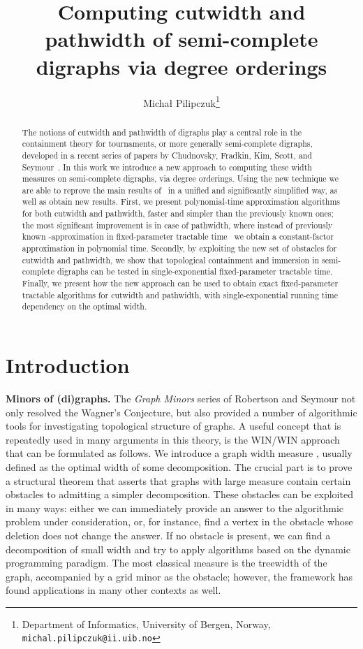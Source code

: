 \documentclass[a4paper,10pt]{article}
\title{Computing cutwidth and pathwidth of semi-complete digraphs via degree orderings}
\date{}
\author{Micha\l{} Pilipczuk\thanks{Department of Informatics, University of Bergen, Norway, \texttt{michal.pilipczuk@ii.uib.no}}}
\begin{document}
\maketitle


\begin{abstract}
The notions of cutwidth and pathwidth of digraphs play a central role in the containment theory for tournaments, or more generally semi-complete digraphs, developed in a recent series of papers by Chudnovsky, Fradkin, Kim, Scott, and Seymour~\cite{ChudnovskyFS2011,ChudnovskySS2011,ChudnovskyS11,fradkin-seymourEDP,fradkin-seymour,kim-seymour-minors}. In this work we introduce a new approach to computing these width measures on semi-complete digraphs, via degree orderings. Using the new technique we are able to reprove the main results of~\cite{ChudnovskyFS2011,fradkin-seymour} in a unified and significantly simplified way, as well as obtain new results. First, we present polynomial-time approximation algorithms for both cutwidth and pathwidth, faster and simpler than the previously known ones; the most significant improvement is in case of pathwidth, where instead of previously known -approximation in fixed-parameter tractable time~\cite{my} we obtain a constant-factor approximation in polynomial time. Secondly, by exploiting the new set of obstacles for cutwidth and pathwidth, we show that topological containment and immersion in semi-complete digraphs can be tested in single-exponential fixed-parameter tractable time. Finally, we present how the new approach can be used to obtain exact fixed-parameter tractable algorithms for cutwidth and pathwidth, with single-exponential running time dependency on the optimal width.
\end{abstract}

\section{Introduction}

{\bf{Minors of (di)graphs.}} The {\em{Graph Minors}} series of Robertson and Seymour not only resolved the Wagner's Conjecture, but also provided a number of algorithmic tools for investigating topological structure of graphs. A useful concept that is repeatedly used in many arguments in this theory, is the WIN/WIN approach that can be formulated as follows. We introduce a graph width measure , usually defined as the optimal width of some decomposition. The crucial part is to prove a structural theorem that asserts that graphs with large measure  contain certain obstacles to admitting a simpler decomposition. These obstacles can be exploited in many ways: either we can immediately provide an answer to the algorithmic problem under consideration, or, for instance, find a vertex in the obstacle whose deletion does not change the answer. If no obstacle is present, we can find a decomposition of small width and try to apply algorithms based on the dynamic programming paradigm. The most classical measure  is the treewidth of the graph, accompanied by a grid minor as the obstacle; however, the framework has found applications in many other contexts as well.
\end{document}
